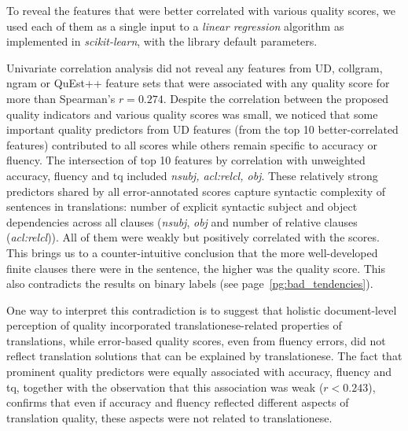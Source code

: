 To reveal the features that were better correlated with various quality scores, we used each of them as a single input to a \textit{linear regression} algorithm as implemented in \textit{scikit-learn}, with the library default parameters.  %

Univariate correlation analysis did not reveal any features from UD, collgram, ngram or QuEst++ feature sets that were associated with any quality score for more than Spearman's $r=0.274$. %
\label{pg:scores_not_translationese}
Despite the correlation between the proposed quality indicators and various quality scores was small, we noticed that some important quality predictors from UD features (from the top 10 better-correlated features) contributed to all scores while others remain specific to accuracy or fluency. The intersection of top 10 features by correlation with unweighted accuracy, fluency and tq included \textit{nsubj, acl:relcl, obj}. These relatively strong predictors shared by all error-annotated scores capture syntactic complexity of sentences in translations: number of explicit syntactic subject and object dependencies across all clauses (\textit{nsubj}, \textit{obj} and number of relative clauses (\textit{acl:relcl})). All of them were weakly but positively correlated with the scores. This brings us to a counter-intuitive conclusion that the more well-developed finite clauses there were in the sentence, the higher was the quality score. This also contradicts the results on binary labels (see page~\ref{pg:bad_tendencies}).

One way to interpret this contradiction is to suggest that holistic document-level perception of quality incorporated translationese-related properties of translations, while error-based quality scores, even from fluency errors, did not reflect translation solutions that can be explained by translationese. 
The fact that prominent quality predictors were equally associated with accuracy, fluency and tq, together with the observation that this association was weak ($r<0.243$), confirms that even if accuracy and fluency reflected different aspects of translation quality, these aspects were not related to translationese.

